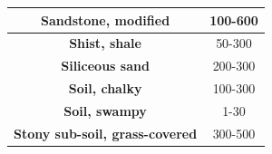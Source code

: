 \documentclass[12pt,fleqn]{book} %
\begin{document}
\begin{enumerate}
\begin{table}[!h]
\begin{tabular}{!{\color[rgb]{0.557,0.667,0.859}\vrule}c!{\color{black}\vrule}c!{\color[rgb]{0.557,0.667,0.859}\vrule}}
\hline
{} \textcolor[rgb]{0.322,0,0}{\textbf{Sandstone, modified}}                                    & 100-600                                                                                                                                                                                                                                                                                                                \\ 
\hline
\textbf{\textcolor[rgb]{0.322,0,0}{Shist,} shale\textcolor[rgb]{0.322,0,0}{}}                                                 & 50-300                                                                                                                                                                                                                                                                                                                 \\ 
\hline
{} \textbf{\textcolor[rgb]{0.322,0,0}{Siliceous} sand\textcolor[rgb]{0.322,0,0}{}}             & 200-300                                                                                                                                                                                                                                                                                                                \\ 
\hline
\textbf{Soil,\textcolor[rgb]{0.322,0,0}{ chalky}}                                                                             & 100-300                                                                                                                                                                                                                                                                                                                \\ 
\hline
{} \textbf{Soil, swampy}                                                                       & 1-30                                                                                                                                                                                                                                                                                                                   \\ 
\hline
\textcolor[rgb]{0.322,0,0}{\textbf{Stony sub-soil, grass-covered}}                                                            & 300-500                                                                                                                                                                                                                                                                                                                \\ 

\end{tabular}
\end{table}
\end{enumerate}
\end{document}
